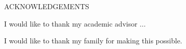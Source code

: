 \begin{center}
\vspace*{0.01in}
ACKNOWLEDGEMENTS
\end{center}

I would like to thank my academic advisor ...


I would like to thank my family for making this possible. 


